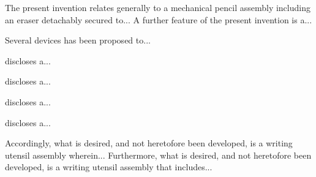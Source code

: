 
\pa
The present invention relates generally to a mechanical pencil assembly including an eraser
detachably secured to...
A further feature of the present invention is a...

\pa
Several devices has been proposed to...

\pa
\cite{Leamond96a} discloses a...

\pa
\cite{Copito92a} discloses a...

\pa
\cite{Saleen90a} discloses a...

\pa
\cite{Ando80a} discloses a...

\pa
Accordingly, what is desired, and not heretofore been developed, is a writing utensil assembly
wherein...
Furthermore, what is desired, and not heretofore been developed, is a writing utensil assembly
that includes...


